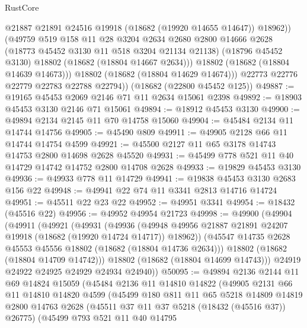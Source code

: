 \begin{lexlean}{RustCore}
\begin{coremodule}
                @21887
                @21891
                @24516
                @19918
                (@18682 (@19920 @14655 @14647))
                @18962))
            (@49759
              @519
              @158
              @11
              @28
              @3204
              @2634
              @2680
              @2800
              @14666
              @2628
              (@18773 @45452 @3130 @11 @518 @3204 @21134 @21138)
              (@18796 @45452 @3130)
              @18802
              (@18682 (@18804 @14667 @2634)))
            @18802
            (@18682 (@18804 @14639 @14673)))
          @18802
          (@18682 (@18804 @14629 @14674)))
        @22773
        @22776
        @22779
        @22783
        @22788
        @22794))
    (@18682 (@22800 @45452 @125))
@49887 := @19165 @45453 @2069 @2146 @71 @11 @2634 @15061 @2398
@49892 := @18903 @45453 @3130 @2146 @71 @15061
@49894 := @18912 @45453 @3130
@49900 := @49894 @2134 @2145 @11 @70 @14758 @15060
@49904 := @45484 @2134 @11 @14744 @14756
@49905 := @45490 @809
@49911 := @49905 @2128 @66 @11 @14744 @14754 @4599
@49921 := @45500 @2127 @11 @65 @3178 @14743 @14753 @2800 @14698 @2628 @45520
@49931 := @45499 @778 @521 @11 @40 @14729 @14742 @14752 @2800 @14708 @2628
@49933 := @19829 @45453 @3130
@49936 := @49933 @778 @11 @14729
@49941 := @19838 @45453 @3130 @2683 @156 @22
@49948 := @49941 @22 @74 @11 @3341 @2813 @14716 @14724
@49951 := @45511 @22 @23 @22
@49952 := @49951 @3341
@49954 := @18432 (@45516 @22)
@49956 := @49952 @49954 @21723
@49998 := @49900
    (@49904
      (@49911
        (@49921
          (@49931
            (@49936
              (@49948 @49956 @21887 @21891 @24207 @19918 (@18682 (@19920 @14724 @14717)) @18962))
            (@45547 @14735 @2628 @45553 @45556 @18802 (@18682 (@18804 @14736 @2634)))
            @18802
            (@18682 (@18804 @14709 @14742)))
          @18802
          (@18682 (@18804 @14699 @14743)))
        @24919
        @24922
        @24925
        @24929
        @24934
        @24940))
@50095 := @49894
    @2136
    @2144
    @11
    @69
    @14824
    @15059
    (@45484
      @2136
      @11
      @14810
      @14822
      (@49905
        @2131
        @66
        @11
        @14810
        @14820
        @4599
        (@45499
          @180
          @811
          @11
          @65
          @5218
          @14809
          @14819
          @2800
          @14763
          @2628
          (@45511 @37 @11 @37 @5218 (@18432 (@45516 @37)) @26775)
          (@45499
            @793
            @521
            @11
            @40
            @14795

\end{coremodule}
\end{lexlean}
